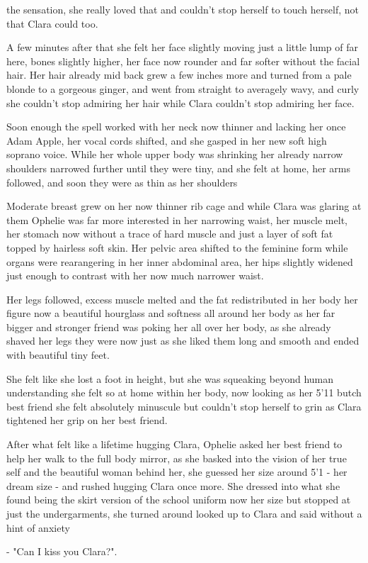 \documentclass[hidelinks,12pt]{book}
\begin{document}
the sensation, she really loved that and couldn't stop herself to touch herself, not that Clara could too.\par 
\bigskip
A few minutes after that she felt her face slightly moving just a little lump of far here, bones slightly higher, 
her face now rounder and far softer without the facial hair. Her hair already mid back grew a few inches more and 
turned from a pale blonde to a gorgeous ginger, and went from straight to averagely wavy, and curly she couldn't stop 
admiring her hair while Clara couldn't stop admiring her face.\par 
\bigskip
Soon enough the spell worked with her neck now thinner and lacking her once Adam Apple, her vocal cords shifted, and she
 gasped in her new soft high soprano voice. While her whole upper body was shrinking her already narrow shoulders 
 narrowed further until they were tiny, and she felt at home, her arms followed, and soon they were as thin as her 
 shoulders\par 
 \bigskip
Moderate breast grew on her now thinner rib cage and while Clara was glaring at them Ophelie was far more interested 
in her narrowing waist, her muscle melt, her stomach now without a trace of hard muscle and just a layer of soft fat 
topped by hairless soft skin. Her pelvic area shifted to the feminine form while organs were rearangering in her inner 
abdominal area, her hips slightly widened just enough to contrast with her now much narrower waist. \par 
\bigskip
Her legs followed, excess muscle melted and the fat redistributed in her body her figure now a beautiful hourglass and 
softness all around her body as her far bigger and stronger friend was poking her all over her body, as she already 
shaved her legs they were now just as she liked them long and smooth and ended with beautiful tiny feet.\par 
\bigskip 
She felt like she lost a foot in height, but she was squeaking beyond human understanding she felt so at home within her
body, now looking as her 5'11 butch best friend she felt absolutely minuscule but couldn't stop herself to grin as Clara 
tightened her grip on her best friend.\par 
\bigskip
After what felt like a lifetime hugging Clara, Ophelie asked her best friend to help her walk to the full body mirror, 
as she basked into the vision of her true self and the beautiful woman behind her, she guessed her size around 5'1 - 
her dream size - and rushed hugging Clara once more. She dressed into what she found being the skirt version of 
the school uniform now her size but stopped at just the undergarments, she turned around looked up to Clara and said 
without a hint of anxiety\par 
\bigskip
- "Can I kiss you Clara?".
\end{document}

